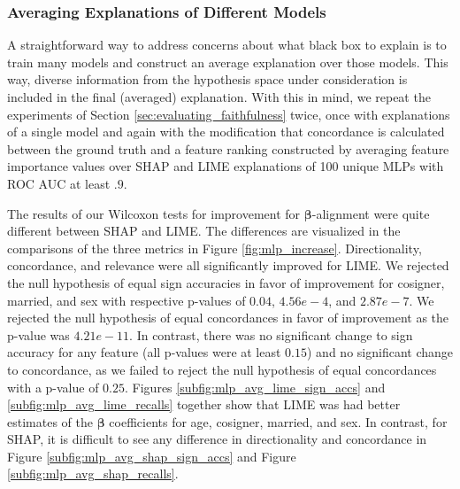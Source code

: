 \documentclass[mnsc,blindrev]{informs3}
\begin{document}
        \subsubsection{Averaging Explanations of Different Models}
            A straightforward way to address concerns about what black box to explain is to train many models and construct an average explanation over those models. This way, diverse information from the hypothesis space under consideration is included in the final (averaged) explanation.%
            With this in mind, we repeat the experiments of Section \ref{sec:evaluating_faithfulness} twice, once with explanations of a single model and again with the modification that concordance is calculated between the ground truth and a feature ranking constructed by averaging feature importance values over SHAP and LIME explanations of 100 unique MLPs with ROC AUC at least $.9$.
             
            The results of our Wilcoxon tests for improvement for $\boldsymbol{\beta}$-alignment were quite different between SHAP and LIME. The differences are visualized in the comparisons of the three metrics in Figure \ref{fig:mlp_increase}. Directionality, concordance, and relevance were all significantly improved for LIME. We rejected the null hypothesis of equal sign accuracies in favor of improvement for cosigner, married, and sex with respective p-values of $0.04$, $4.56e-4$, and $2.87e-7$. We rejected the null hypothesis of equal concordances in favor of improvement as the p-value was $4.21e-11$. In contrast, there was no significant change to sign accuracy for any feature (all p-values were at least $0.15$) and no significant change to concordance, as we failed to reject the null hypothesis of equal concordances with a p-value of $0.25$. Figures \ref{subfig:mlp_avg_lime_sign_accs} and \ref{subfig:mlp_avg_lime_recalls} together show that LIME was had better estimates of  the $\boldsymbol{\beta}$ coefficients for age, cosigner, married, and sex.  In contrast, for SHAP, it is difficult to see any difference in directionality and concordance in Figure \ref{subfig:mlp_avg_shap_sign_accs} and Figure \ref{subfig:mlp_avg_shap_recalls}. %
            
\end{document}
